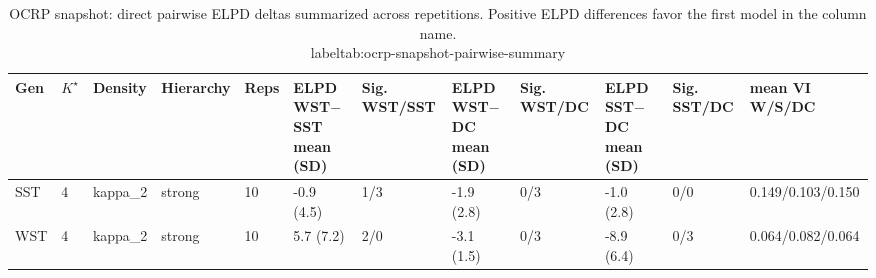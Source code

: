 \begin{table}[!h]
\centering
\caption{OCRP snapshot: direct pairwise ELPD deltas summarized across repetitions. Positive ELPD differences favor the first model in the column name.\\label{tab:ocrp-snapshot-pairwise-summary}}
\centering
\begin{tabular}[t]{llllllllllll}
\toprule
Gen & $K^\star$ & Density & Hierarchy & Reps & ELPD WST$-$SST mean (SD) & Sig. WST/SST & ELPD WST$-$DC mean (SD) & Sig. WST/DC & ELPD SST$-$DC mean (SD) & Sig. SST/DC & mean VI W/S/DC\\
\midrule
SST & 4 & kappa_2 & strong & 10 & -0.9 (4.5) & 1/3 & -1.9 (2.8) & 0/3 & -1.0 (2.8) & 0/0 & 0.149/0.103/0.150\\
WST & 4 & kappa_2 & strong & 10 & 5.7 (7.2) & 2/0 & -3.1 (1.5) & 0/3 & -8.9 (6.4) & 0/3 & 0.064/0.082/0.064\\
\bottomrule
\end{tabular}
\end{table}
